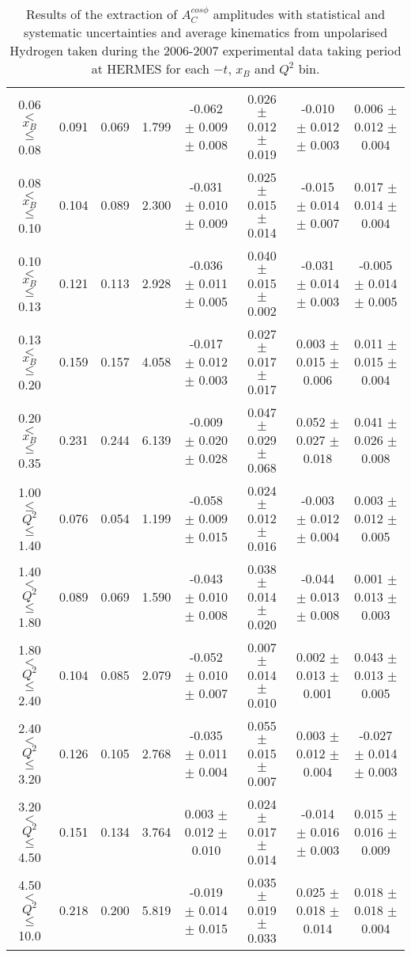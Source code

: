 \begin{table}[width=15cm]
\begin{center}
{\begin{tabular}{|c|c|c|c|c|c|c|c|}
0.06 $<$ $x_{B}$ $\leqslant$ 0.08 &  0.091 & 0.069 &  1.799 &   -0.062  $\pm$  0.009  $\pm$   0.008 &
0.026  $\pm$  0.012  $\pm$   0.019 & -0.010  $\pm$ 0.012  $\pm$   0.003 & 0.006   $\pm$  0.012   $\pm$   0.004\\
0.08 $<$ $x_{B}$ $\leqslant$ 0.10 &  0.104 & 0.089 &  2.300 &  -0.031  $\pm$  0.010  $\pm$   0.009 & 
0.025  $\pm$  0.015  $\pm$   0.014 & -0.015 $\pm$  0.014 $\pm$    0.007 & 0.017   $\pm$  0.014    $\pm$  0.004\\
0.10 $<$ $x_{B}$ $\leqslant$ 0.13 &  0.121 &  0.113 &  2.928 &  -0.036  $\pm$  0.011  $\pm$   0.005 & 
0.040  $\pm$  0.015 $\pm$   0.002 & -0.031 $\pm$  0.014  $\pm$   0.003 & -0.005   $\pm$  0.014  $\pm$    0.005\\
0.13 $<$ $x_{B}$ $\leqslant$ 0.20 &  0.159 & 0.157 &  4.058&   -0.017   $\pm$ 0.012  $\pm$   0.003 & 
0.027  $\pm$  0.017 $\pm$    0.017 & 0.003  $\pm$  0.015  $\pm$   0.006 & 0.011   $\pm$  0.015   $\pm$  0.004\\
0.20 $<$ $x_{B}$ $\leqslant$ 0.35 &  0.231 & 0.244 &  6.139 &  -0.009 $\pm$  0.020   $\pm$  0.028 & 
0.047  $\pm$  0.029   $\pm$    0.068 & 0.052  $\pm$  0.027  $\pm$   0.018 & 0.041  $\pm$   0.026  $\pm$   0.008\\
\hline
1.00 $\leqslant$ $Q^{2}$ $\leqslant$ 1.40 &  0.076 & 0.054  & 1.199 &  -0.058  $\pm$  0.009  $\pm$   0.015 & 
0.024  $\pm$  0.012  $\pm$   0.016 &  -0.003 $\pm$  0.012  $\pm$  0.004 & 0.003  $\pm$  0.012   $\pm$   0.005\\
1.40 $<$ $Q^{2}$ $\leqslant$ 1.80 &  0.089 & 0.069 &  1.590 &  -0.043  $\pm$  0.010  $\pm$   0.008 & 
0.038  $\pm$  0.014  $\pm$   0.020 & -0.044  $\pm$  0.013  $\pm$  0.008 & 0.001  $\pm$  0.013   $\pm$  0.003\\
1.80 $<$ $Q^{2}$ $\leqslant$ 2.40 &  0.104 & 0.085 &  2.079 &  -0.052  $\pm$  0.010  $\pm$   0.007 &
 0.007  $\pm$  0.014  $\pm$   0.010 & 0.002 $\pm$   0.013  $\pm$  0.001 & 0.043  $\pm$   0.013  $\pm$  0.005\\
2.40 $<$ $Q^{2}$ $\leqslant$ 3.20 &  0.126 & 0.105  & 2.768 &  -0.035 $\pm$   0.011  $\pm$   0.004 &  
0.055  $\pm$  0.015  $\pm$   0.007 & 0.003  $\pm$  0.012  $\pm$  0.004 & -0.027  $\pm$  0.014  $\pm$  0.003\\
3.20 $<$ $Q^{2}$ $\leqslant$ 4.50 &  0.151 & 0.134 &  3.764 &  0.003  $\pm$  0.012   $\pm$  0.010 & 
0.024 $\pm$   0.017  $\pm$   0.014 & -0.014  $\pm$  0.016 $\pm$ 0.003 & 0.015   $\pm$  0.016  $\pm$  0.009\\
4.50 $<$ $Q^{2}$ $\leqslant$ 10.0 &  0.218 & 0.200 &  5.819 &  -0.019  $\pm$  0.014  $\pm$   0.015 & 
0.035  $\pm$  0.019  $\pm$  0.033 & 0.025 $\pm$   0.018  $\pm$  0.014 & 0.018   $\pm$  0.018   $\pm$   0.004\\
\hline
  \end{tabular}
}
 \end{center}
\caption{Results of the extraction of $A_{C}^{cos\phi}$ amplitudes with statistical and systematic uncertainties and average kinematics from unpolarised Hydrogen taken during
the 2006-2007 experimental data taking period at HERMES for each $-t$, $x_{B}$ and $Q^{2}$ bin.}
\end{table}


